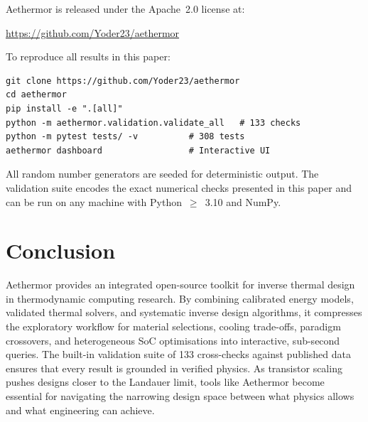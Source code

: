 \documentclass[11pt,twocolumn]{article}
\begin{document}
Aethermor is released under the Apache~2.0 license at:

\begin{center}
\url{https://github.com/Yoder23/aethermor}
\end{center}

\noindent To reproduce all results in this paper:

\begin{lstlisting}
git clone https://github.com/Yoder23/aethermor
cd aethermor
pip install -e ".[all]"
python -m aethermor.validation.validate_all   # 133 checks
python -m pytest tests/ -v          # 308 tests
aethermor dashboard                 # Interactive UI
\end{lstlisting}

\noindent All random number generators are seeded for deterministic
output. The validation suite encodes the exact numerical checks
presented in this paper and can be run on any machine with
Python~$\geq$~3.10 and NumPy.


\section{Conclusion}
\label{sec:conclusion}

Aethermor provides an integrated open-source toolkit for inverse thermal
design in thermodynamic computing research.  By combining calibrated
energy models, validated thermal solvers, and systematic inverse
design algorithms, it compresses the exploratory workflow for material
selections, cooling trade-offs, paradigm crossovers, and
heterogeneous SoC optimisations into interactive, sub-second queries. The
built-in validation suite of 133 cross-checks against published data
ensures that every result is grounded in verified physics. As
transistor scaling pushes designs closer to the Landauer limit, tools
like Aethermor become essential for navigating the narrowing design
space between what physics allows and what engineering can achieve.
\end{document}
